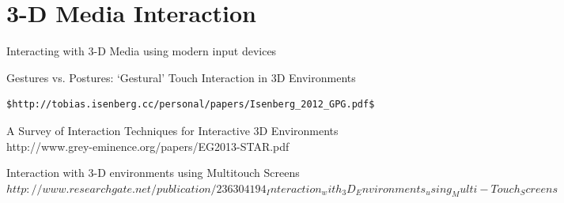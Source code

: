 \documentclass[11pt]{report}
\begin{document}
\pagebreak

\section{3-D Media Interaction}

Interacting with 3-D Media using modern input devices

Gestures vs. Postures: ‘Gestural’ Touch Interaction in 3D Environments 

\begin{verbatim}
$http://tobias.isenberg.cc/personal/papers/Isenberg_2012_GPG.pdf$
\end{verbatim}
A Survey of Interaction Techniques for Interactive 3D Environments http://www.grey-eminence.org/papers/EG2013-STAR.pdf

Interaction with 3-D environments using Multitouch Screens $http://www.researchgate.net/publication/236304194_Interaction_with_3D_Environments_using_Multi-Touch_Screens$
\end{document}
